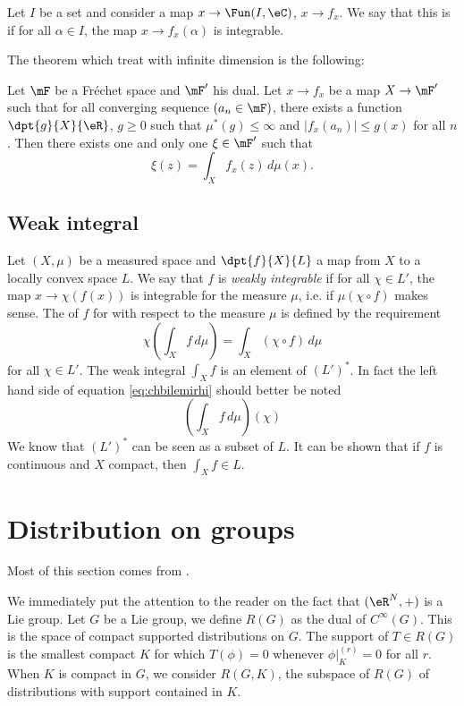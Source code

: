 Let $I$ be a set and consider a map $x\to\Fun(I,\eC)$, $x\to f_x$. We say that this is  if for all $\alpha\in I$, the map $x\to f_x(\alpha)$ is integrable.

The theorem which treat with infinite dimension is the following:

\begin{theorem}
	Let $\mF$ be a Fréchet space and $\mF'$ his dual. Let $x\to f_x$ be a map $X\to\mF'$ such that for all converging sequence $(a_n\in\mF)$, there exists a function  $\dpt{g}{X}{\eR}$, $g\geq0$ such that $\mu^*(g)\leq\infty$ and $| f_x(a_n) |\leq g(x)$ for all $n$. Then there exists one and only one $\xi\in\mF'$ such that
	\begin{equation}
		\xi(z)=\int_Xf_x(z)\,d\mu(x).
	\end{equation}

\end{theorem}

\subsection{Weak integral}

Let $(X,\mu)$ be a measured space and $\dpt{f}{X}{L}$ a map from $X$ to a locally convex space $L$. We say that $f$ is \emph{weakly integrable} if for all $\chi\in L'$, the map $x\to \chi(f(x))$ is integrable for the measure $\mu$, i.e. if $\mu(\chi\circ f)$ makes sense. The  of $f$ for with respect to the measure $\mu$ is defined by the requirement
\begin{equation} \label{eq:chbilemirhi}
	\chi\left( \int_Xf\,d\mu \right)=\int_X(\chi\circ f)\,d\mu
\end{equation}
for all $\chi\in L'$. The weak integral $\int_Xf$ is an element of $(L')^*$. In fact the left hand side of equation \eqref{eq:chbilemirhi} should better be noted
\[
	\left( \int_Xf\,d\mu \right)(\chi)
\]
We know that $(L')^*$ can be seen as a subset of $L$. It can be shown that if $f$ is continuous and $X$ compact, then $\int_Xf\in L$.
%
\section{Distribution on groups}
%

Most of this section comes from \cite{Kirillov}.

We immediately put the attention to the reader on the fact that $(\eR^N,+)$ is a Lie group. Let $G$ be a Lie group, we define $R(G)$ as the dual of $ C^{\infty}(G)$. This is the space of compact supported distributions on $G$. The support of $T\in R(G)$ is the smallest compact $K$ for which $T(\phi)=0$ whenever $\phi|_K^{(r)}=0$ for all $r$. When $K$ is compact in $G$, we consider $R(G,K)$, the subspace of $R(G)$ of distributions with support contained in $K$.

